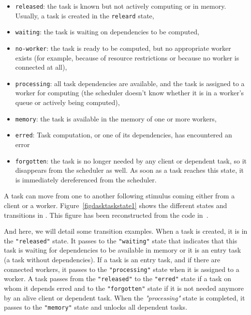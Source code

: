 \begin{itemize}
    \item \texttt{released}: the task is known but not actively computing or in memory. Usually, a task is created in the \texttt{releard} state,

    \item \texttt{waiting}: the task is waiting on dependencies to be computed,

    \item \texttt{no-worker}: the task is ready to be computed, but no appropriate worker exists (for example, because of resource restrictions or because no worker is connected at all),

    \item \texttt{processing}: all task dependencies are available, and the task is assigned to a worker for computing (the scheduler doesn’t know whether it is in a worker's queue or actively being computed),

    \item \texttt{memory}: the task is available in the memory of one or more workers,

    \item \texttt{erred}: Task computation, or one of its dependencies, has encountered an error

    \item \texttt{forgotten}: the task is no longer needed by any client or dependent task, so it disappears from the scheduler as well. As soon as a task reaches this state, it is immediately dereferenced from the scheduler.
\end{itemize}

A task can move from one to another following stimulus coming either from a client or a worker. Figure~\ref{figdasktaskstate1} shows the different states and transitions in \dask. This figure has been reconstructed from the code in~\cite{amal_distributed_2022}. 

And here, we will detail some transition examples. 
When a task is created, it is in the \texttt{"released"} state. It passes to the \texttt{"waiting"} state that indicates that this task is waiting for dependencies to be available in memory or it is an entry task (a task without dependencies).
If a task is an entry task, and if there are connected workers, it passes to the \texttt{"processing"} state when it is assigned to a worker.  
A task passes from the \texttt{"released"} to the \texttt{"erred"} state if a task on whom it depends erred and to the \texttt{"forgotten"} state if it is not needed anymore by an alive client or dependent task. 
When the \textit{"processing"} state is completed, it passes to the \texttt{"memory"} state and unlocks all dependent tasks. 

